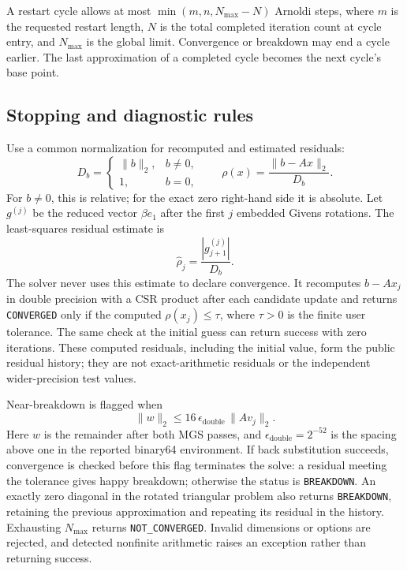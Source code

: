 A restart cycle allows at most $\min(m,n,N_{\max}-N)$ Arnoldi steps, where $m$
is the requested restart length, $N$ is the total completed iteration count at
cycle entry, and $N_{\max}$ is the global limit. Convergence or breakdown may
end a cycle earlier. The last approximation of a completed cycle becomes the
next cycle's base point.

\subsection{Stopping and diagnostic rules}

Use a common normalization for recomputed and estimated residuals:
\begin{equation}
    D_b=\begin{cases}\lVert b\rVert_2,&b\ne0,\\1,&b=0,\end{cases}
    \qquad \rho(x)=\frac{\lVert b-Ax\rVert_2}{D_b}.
    \label{eq:true-residual}
\end{equation}
For $b\ne0$, this is relative; for the exact zero right-hand side it is absolute.
Let $g^{(j)}$ be the reduced vector $\beta e_1$ after the first $j$ embedded
Givens rotations. The least-squares residual estimate is
\begin{equation}
    \widehat{\rho}_j=
    \frac{|g^{(j)}_{j+1}|}{D_b}.
\end{equation}
The solver never uses this estimate to declare convergence. It recomputes
$b-Ax_j$ in double precision with a CSR product after each candidate update and
returns \texttt{CONVERGED} only if the computed $\rho(x_j)\leq\tau$, where
$\tau>0$ is the finite user tolerance. The same check at the initial guess can
return success with zero iterations. These computed residuals, including the
initial value, form the public residual history; they are not exact-arithmetic
residuals or the independent wider-precision test values.

Near-breakdown is flagged when
\begin{equation}
    \lVert w\rVert_2 \leq
    16\,\epsilon_{\mathrm{double}}\,\lVert Av_j\rVert_2.
\end{equation}
Here $w$ is the remainder after both MGS passes, and
$\epsilon_{\mathrm{double}}=2^{-52}$ is the spacing above one in the reported
binary64 environment. If back substitution succeeds, convergence is checked
before this flag terminates the solve: a residual meeting the tolerance gives
happy breakdown; otherwise the status is \texttt{BREAKDOWN}. An exactly zero
diagonal in the rotated triangular problem also returns \texttt{BREAKDOWN},
retaining the previous approximation and repeating its residual in the history.
Exhausting $N_{\max}$ returns \texttt{NOT\_CONVERGED}. Invalid dimensions or
options are rejected, and detected nonfinite arithmetic raises an exception
rather than returning success.
